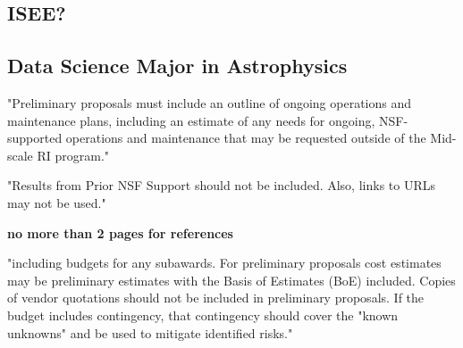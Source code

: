 \documentclass[oneside,11pt]{amsart}
\newcommand{\comment}[2][todo]{{\color{#1}[[{\bf #2}]]}}
\begin{document}
\subsection{ISEE?}
\noindent \comment{1/2 page}


% 
% 
% 
% 
% 
% 
% 
% 
% 
% 
% 
% 


\subsection{Data Science Major in Astrophysics}
\noindent \comment{1/4 page}


"Preliminary proposals must include an outline of ongoing operations and
maintenance plans, including an estimate of any needs for ongoing,
NSF-supported operations and maintenance that may be requested outside
of the Mid-scale RI program."

"Results from Prior NSF Support should not be included. Also, links to
URLs may not be used."

\vspace{-0.5cm}

{\bf no more than 2 pages for references}

\clearpage




\newpage


"including budgets for any subawards. For preliminary proposals cost
estimates may be preliminary estimates with the Basis of Estimates (BoE)
included. Copies of vendor quotations should not be included in
preliminary proposals. If the budget includes contingency, that
contingency should cover the "known unknowns" and be used to mitigate
identified risks."
\end{document}
